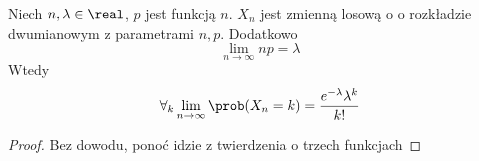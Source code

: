 \begin{theorem}
	Niech \(n, \lambda \in \real\), \(p\) jest funkcją \(n\). \(X_n\) jest zmienną losową o o rozkładzie dwumianowym z parametrami \(n, p\). Dodatkowo
	\[
		\lim_{n \to \infty} np = \lambda
	\]
	Wtedy
	\[
		\forall_k \lim_{n \to \infty} \prob(X_n = k) = \frac{e^{-\lambda}\lambda^k}{k!}
	\]
\end{theorem}
\begin{proof}
	Bez dowodu, ponoć idzie z twierdzenia o trzech funkcjach
\end{proof}
